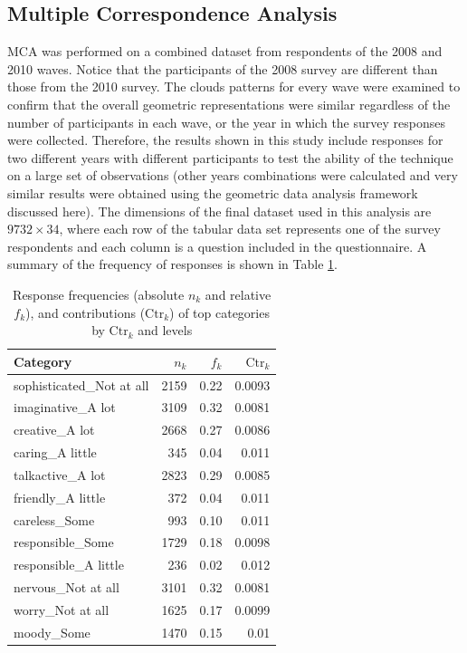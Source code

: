 \documentclass[conference]{IEEEtran}
\begin{document}
\hypertarget{multiple-correspondence-analysis}{%
\subsection{Multiple Correspondence
Analysis}\label{multiple-correspondence-analysis}}

MCA was performed on a combined dataset from respondents of the 2008 and
2010 waves. Notice that the participants of the 2008 survey are
different than those from the 2010 survey. The clouds patterns for every
wave were examined to confirm that the overall geometric representations
were similar regardless of the number of participants in each wave, or
the year in which the survey responses were collected. Therefore, the
results shown in this study include responses for two different years
with different participants to test the ability of the technique on a
large set of observations (other years combinations were calculated and
very similar results were obtained using the geometric data analysis
framework discussed here). The dimensions of the final dataset used in
this analysis are \(9732 \times 34\), where each row of the tabular data
set represents one of the survey respondents and each column is a
question included in the questionnaire. A summary of the frequency of
responses is shown in Table \ref{tab:fknkTop12}.

\begin{table}[ht!]
\caption{Response frequencies (absolute $n_k$ and relative $f_k$), and contributions ($\text{Ctr}_k$) of  top categories by $\text{Ctr}_k$ and levels} 
\centering
\begin{tabular}{lrrr}
  \hline
  Category & $n_k$ & $f_k$ & $\text{Ctr}_k$ \\ 
  \hline
  sophisticated\_Not at all & 2159 & 0.22 & 0.0093 \\ 
  imaginative\_A lot & 3109 & 0.32 & 0.0081 \\ 
  creative\_A lot & 2668 & 0.27 & 0.0086 \\ 
  caring\_A little & 345 & 0.04 & 0.011 \\ 
  talkactive\_A lot & 2823 & 0.29 & 0.0085 \\ 
  friendly\_A little & 372 & 0.04 & 0.011 \\ 
  careless\_Some & 993 & 0.10 & 0.011 \\ 
  responsible\_Some & 1729 & 0.18 & 0.0098 \\ 
  responsible\_A little & 236 & 0.02 & 0.012 \\ 
  nervous\_Not at all & 3101 & 0.32 & 0.0081 \\ 
  worry\_Not at all & 1625 & 0.17 & 0.0099 \\ 
  moody\_Some & 1470 & 0.15 & 0.01 \\ 
   \hline
\end{tabular}
\label{tab:fknkTop12}
\end{table}
\end{document}
